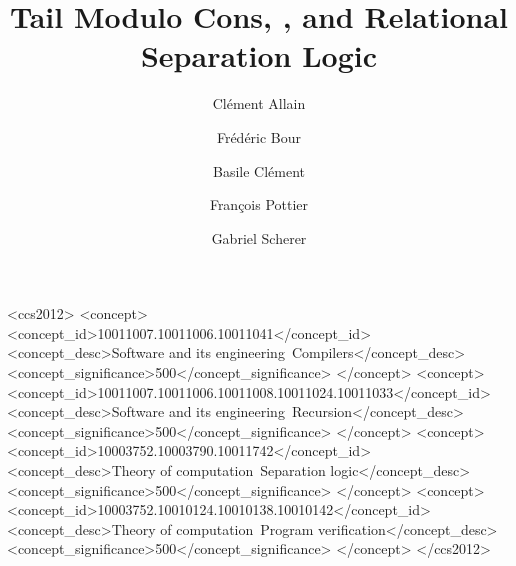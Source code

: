 \documentclass[acmsmall,screen]{acmart}
\begin{document}

\title{Tail Modulo Cons, \OCaml, and Relational Separation Logic}

\author{Clément Allain}

\author{Frédéric Bour}

\author{Basile Clément}

\author{François Pottier}

\author{Gabriel Scherer}

\begin{CCSXML}
<ccs2012>
   <concept>
       <concept_id>10011007.10011006.10011041</concept_id>
       <concept_desc>Software and its engineering~Compilers</concept_desc>
       <concept_significance>500</concept_significance>
       </concept>
   <concept>
       <concept_id>10011007.10011006.10011008.10011024.10011033</concept_id>
       <concept_desc>Software and its engineering~Recursion</concept_desc>
       <concept_significance>500</concept_significance>
       </concept>
   <concept>
       <concept_id>10003752.10003790.10011742</concept_id>
       <concept_desc>Theory of computation~Separation logic</concept_desc>
       <concept_significance>500</concept_significance>
       </concept>
   <concept>
       <concept_id>10003752.10010124.10010138.10010142</concept_id>
       <concept_desc>Theory of computation~Program verification</concept_desc>
       <concept_significance>500</concept_significance>
       </concept>
 </ccs2012>
\end{CCSXML}

\end{document}
